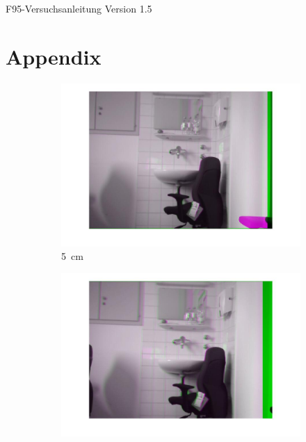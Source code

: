 \begin{thebibliography}{0}
   F95-Versuchsanleitung Version 1.5
\end{thebibliography}

\section{Appendix}
\begin{figure}[h]
  \caption{Überlagerung bei verschiedenen Translationen der Kamera}
  \label{pic:transl}
  \begin{subfigure}{0.48\linewidth}
    \centering
    \includegraphics[width=\linewidth]{images/A1_05cm.jpg}
    \vspace{-30pt}
    \caption{\SI{5}{\centi\meter}}
  \end{subfigure}
  \hfill
  \begin{subfigure}{0.48\linewidth}
    \centering
    \includegraphics[width=\linewidth]{images/A1_10cm.jpg}

\end{subfigure}
\end{figure}
